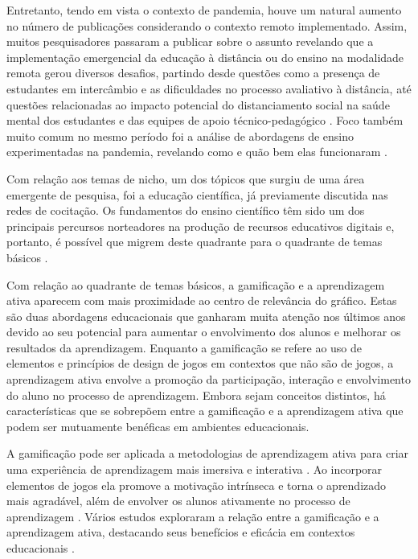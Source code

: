 \documentclass[portuguese]{textolivre}
\begin{document}
Entretanto, tendo em vista o contexto de pandemia, houve um natural aumento no número de publicações considerando o contexto remoto implementado. Assim, muitos pesquisadores passaram a publicar sobre o assunto revelando que a implementação emergencial da educação à distância ou do ensino na modalidade remota gerou diversos desafios, partindo desde questões como a presença de estudantes em intercâmbio e as dificuldades no processo avaliativo à distância, até questões relacionadas ao impacto potencial do distanciamento social na saúde mental dos estudantes e das equipes de apoio técnico-pedagógico \cite{sahu_closure_2020}. Foco também muito comum no mesmo período foi a análise de abordagens de ensino experimentadas na pandemia, revelando como e quão bem elas funcionaram \cite{holme_introduction_2020}.

Com relação aos temas de nicho, um dos tópicos que surgiu de uma área emergente de pesquisa, foi a educação científica, já previamente discutida nas redes de cocitação. Os fundamentos do ensino científico têm sido um dos principais percursos norteadores na produção de recursos educativos digitais e, portanto, é possível que migrem deste quadrante para o quadrante de temas básicos \cite{handelsman_scientific_2004,couch_scientific_2015}.

Com relação ao quadrante de temas básicos, a gamificação e a aprendizagem ativa aparecem com mais proximidade ao centro de relevância do gráfico. Estas são duas abordagens educacionais que ganharam muita atenção nos últimos anos devido ao seu potencial para aumentar o envolvimento dos alunos e melhorar os resultados da aprendizagem. Enquanto a gamificação se refere ao uso de elementos e princípios de design de jogos em contextos que não são de jogos, a aprendizagem ativa envolve a promoção da participação, interação e envolvimento do aluno no processo de aprendizagem. Embora sejam conceitos distintos, há características que se sobrepõem entre a gamificação e a aprendizagem ativa que podem ser mutuamente benéficas em ambientes educacionais.

A gamificação pode ser aplicada a metodologias de aprendizagem ativa para criar uma experiência de aprendizagem mais imersiva e interativa \cite{jones_kahoot!_2019}. Ao incorporar elementos de jogos ela promove a motivação intrínseca e torna o aprendizado mais agradável, além de envolver os alunos ativamente no processo de aprendizagem \cite{subhash_gamified_2018}. Vários estudos exploraram a relação entre a gamificação e a aprendizagem ativa, destacando seus benefícios e eficácia em contextos educacionais \cite{murillo-zamorano_gamification_2021,seaborn_gamification_2015,subhash_gamified_2018}.
\end{document}
